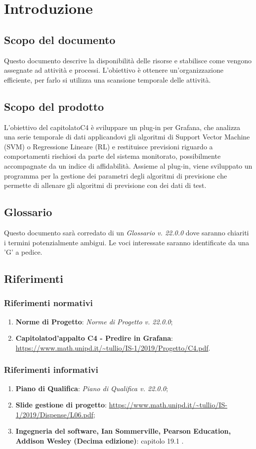 \section{Introduzione}
	\subsection{Scopo del documento}
		Questo documento descrive la disponibilità delle risorse e stabilisce come vengono assegnate ad attività e processi\glo. L'obiettivo è ottenere un'organizzazione efficiente, per farlo si utilizza una scansione temporale delle attività.
	\subsection{Scopo del prodotto}
		L'obiettivo del capitolato\glosp C4 è sviluppare un plug-in per Grafana\glo, che analizza una serie temporale di dati applicandovi gli algoritmi di Support Vector Machine (SVM\glo) o Regressione Lineare (RL\glo) e restituisce previsioni riguardo a comportamenti rischiosi da parte del sistema monitorato, possibilmente accompagnate da un indice di affidabilità. Assieme al plug-in, viene sviluppato un programma per la gestione dei parametri degli algoritmi di previsione che permette di allenare gli algoritmi di previsione con dei dati di test.
	\subsection{Glossario}
		Questo documento sarà corredato di un \textit{Glossario v. 22.0.0} dove saranno chiariti i termini potenzialmente ambigui.
		Le voci interessate saranno identificate da una 'G' a pedice.
	\subsection{Riferimenti}
		\subsubsection{Riferimenti normativi}
			\begin{enumerate}
				\item \textbf{Norme di Progetto}: \textit{Norme di Progetto v. 22.0.0};
				\item \textbf{Capitolato}\glosp \textbf{d'appalto C4 - Predire in Grafana}\glo: \url{https://www.math.unipd.it/~tullio/IS-1/2019/Progetto/C4.pdf}.
			\end{enumerate}
		\subsubsection{Riferimenti informativi}
			\begin{enumerate}
				\item \textbf{Piano di Qualifica}: \textit{Piano di Qualifica v. 22.0.0};
				\item \textbf{Slide gestione di progetto}\glo: \url{https://www.math.unipd.it/~tullio/IS-1/2019/Dispense/L06.pdf};
				\item \textbf{Ingegneria del software, Ian Sommerville, Pearson Education, Addison Wesley (Decima edizione)}: capitolo 19.1 .
			\end{enumerate}
